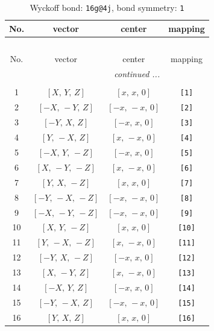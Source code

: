 \documentclass[fleqn,8pt]{jsarticle}
\begin{document}
\begin{longtable}{cccc}
\caption{Wyckoff bond: {\tt 16g@4j}, bond symmetry: {\tt 1}}
 \\
 \hline \hline
No. & vector & center & mapping \\ \hline \endfirsthead

\multicolumn{3}{l}{\tablename\ \thetable{}} \\
 \hline \hline
No. & vector & center & mapping \\ \hline \endhead

 \hline \hline
\multicolumn{3}{r}{\footnotesize\it continued ...} \\ \endfoot

 \hline \hline
\multicolumn{3}{r}{} \\ \endlastfoot

1 & $\left[ X,\, Y,\, Z \right]$ & $\left[ x,\, x,\, 0 \right]$ & {\tt [1]} \\ \hline
2 & $\left[ - X,\, - Y,\, Z \right]$ & $\left[ - x,\, - x,\, 0 \right]$ & {\tt [2]} \\ \hline
3 & $\left[ - Y,\, X,\, Z \right]$ & $\left[ - x,\, x,\, 0 \right]$ & {\tt [3]} \\ \hline
4 & $\left[ Y,\, - X,\, Z \right]$ & $\left[ x,\, - x,\, 0 \right]$ & {\tt [4]} \\ \hline
5 & $\left[ - X,\, Y,\, - Z \right]$ & $\left[ - x,\, x,\, 0 \right]$ & {\tt [5]} \\ \hline
6 & $\left[ X,\, - Y,\, - Z \right]$ & $\left[ x,\, - x,\, 0 \right]$ & {\tt [6]} \\ \hline
7 & $\left[ Y,\, X,\, - Z \right]$ & $\left[ x,\, x,\, 0 \right]$ & {\tt [7]} \\ \hline
8 & $\left[ - Y,\, - X,\, - Z \right]$ & $\left[ - x,\, - x,\, 0 \right]$ & {\tt [8]} \\ \hline
9 & $\left[ - X,\, - Y,\, - Z \right]$ & $\left[ - x,\, - x,\, 0 \right]$ & {\tt [9]} \\ \hline
10 & $\left[ X,\, Y,\, - Z \right]$ & $\left[ x,\, x,\, 0 \right]$ & {\tt [10]} \\ \hline
11 & $\left[ Y,\, - X,\, - Z \right]$ & $\left[ x,\, - x,\, 0 \right]$ & {\tt [11]} \\ \hline
12 & $\left[ - Y,\, X,\, - Z \right]$ & $\left[ - x,\, x,\, 0 \right]$ & {\tt [12]} \\ \hline
13 & $\left[ X,\, - Y,\, Z \right]$ & $\left[ x,\, - x,\, 0 \right]$ & {\tt [13]} \\ \hline
14 & $\left[ - X,\, Y,\, Z \right]$ & $\left[ - x,\, x,\, 0 \right]$ & {\tt [14]} \\ \hline
15 & $\left[ - Y,\, - X,\, Z \right]$ & $\left[ - x,\, - x,\, 0 \right]$ & {\tt [15]} \\ \hline
16 & $\left[ Y,\, X,\, Z \right]$ & $\left[ x,\, x,\, 0 \right]$ & {\tt [16]} \\
\end{longtable}
\end{document}
